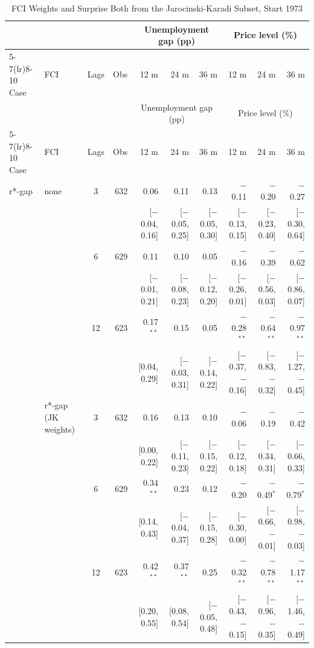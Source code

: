 \begingroup\scriptsize\setlength{\tabcolsep}{0.9pt}
\begin{longtable}{llcrrrrrrr}
\caption{FCI Weights and Surprise Both from the Jarocinski-Karadi Subset, Start 1973}\label{tab:appR5d73}\\
\toprule
 & & & & \multicolumn{3}{c}{Unemployment gap (pp)} & \multicolumn{3}{c}{Price level (\%)}\\ \cmidrule(lr){5-7}\cmidrule(lr){8-10}
Case & FCI & Lags & Obs & 12 m & 24 m & 36 m & 12 m & 24 m & 36 m\\
\midrule\endfirsthead
\toprule
 & & & & \multicolumn{3}{c}{Unemployment gap (pp)} & \multicolumn{3}{c}{Price level (\%)}\\ \cmidrule(lr){5-7}\cmidrule(lr){8-10}
Case & FCI & Lags & Obs & 12 m & 24 m & 36 m & 12 m & 24 m & 36 m\\
\midrule\endhead
\bottomrule\endfoot
r*-gap & none & 3 & 632 & 0.06 & 0.11 & 0.13 & $-$0.11 & $-$0.20 & $-$0.27\\
 & & & & {\scriptsize [$-$0.04, 0.16]} & {\scriptsize [$-$0.05, 0.25]} & {\scriptsize [$-$0.05, 0.30]} & {\scriptsize [$-$0.13, 0.15]} & {\scriptsize [$-$0.23, 0.40]} & {\scriptsize [$-$0.30, 0.64]}\\
 &  & 6 & 629 & 0.11 & 0.10 & 0.05 & $-$0.16 & $-$0.39 & $-$0.62\\
 & & & & {\scriptsize [$-$0.01, 0.21]} & {\scriptsize [$-$0.08, 0.23]} & {\scriptsize [$-$0.12, 0.20]} & {\scriptsize [$-$0.26, 0.01]} & {\scriptsize [$-$0.56, 0.03]} & {\scriptsize [$-$0.86, 0.07]}\\
 &  & 12 & 623 & 0.17$^{**}$ & 0.15 & 0.05 & $-$0.28$^{**}$ & $-$0.64$^{**}$ & $-$0.97$^{**}$\\
 & & & & {\scriptsize [0.04, 0.29]} & {\scriptsize [$-$0.03, 0.31]} & {\scriptsize [$-$0.14, 0.22]} & {\scriptsize [$-$0.37, $-$0.16]} & {\scriptsize [$-$0.83, $-$0.32]} & {\scriptsize [$-$1.27, $-$0.45]}\\
 & r*-gap (JK weights) & 3 & 632 & 0.16 & 0.13 & 0.10 & $-$0.06 & $-$0.19 & $-$0.42\\
 & & & & {\scriptsize [0.00, 0.22]} & {\scriptsize [$-$0.11, 0.23]} & {\scriptsize [$-$0.15, 0.22]} & {\scriptsize [$-$0.12, 0.18]} & {\scriptsize [$-$0.34, 0.31]} & {\scriptsize [$-$0.66, 0.33]}\\
 &  & 6 & 629 & 0.34$^{**}$ & 0.23 & 0.12 & $-$0.20 & $-$0.49$^{*}$ & $-$0.79$^{*}$\\
 & & & & {\scriptsize [0.14, 0.43]} & {\scriptsize [$-$0.04, 0.37]} & {\scriptsize [$-$0.15, 0.28]} & {\scriptsize [$-$0.30, 0.00]} & {\scriptsize [$-$0.66, $-$0.01]} & {\scriptsize [$-$0.98, $-$0.03]}\\
 &  & 12 & 623 & 0.42$^{**}$ & 0.37$^{**}$ & 0.25 & $-$0.32$^{**}$ & $-$0.78$^{**}$ & $-$1.17$^{**}$\\
 & & & & {\scriptsize [0.20, 0.55]} & {\scriptsize [0.08, 0.54]} & {\scriptsize [$-$0.05, 0.48]} & {\scriptsize [$-$0.43, $-$0.15]} & {\scriptsize [$-$0.96, $-$0.35]} & {\scriptsize [$-$1.46, $-$0.49]}\\
\end{longtable}

